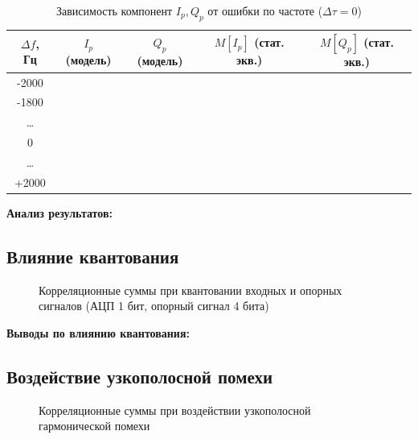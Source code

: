 \begin{table}[H]
    \centering
    \caption{Зависимость компонент $I_p, Q_p$ от ошибки по частоте ($\Delta \tau = 0$)}
    \begin{tabular}{@{}ccccc@{}}
        \toprule
        $\Delta f$, Гц & $I_p$ (модель) & $Q_p$ (модель) & $M[I_p]$ (стат. экв.) & $M[Q_p]$ (стат. экв.) \\ \midrule
        -2000 & & & & \\
        -1800 & & & & \\
        \dots & & & & \\
        0 & & & & \\
        \dots & & & & \\
        +2000 & & & & \\ \bottomrule
    \end{tabular}
\end{table}

\textbf{Анализ результатов:}\\

\subsection{Влияние квантования}

\begin{figure}[H]
    \centering
    \caption{Корреляционные суммы при квантовании входных и опорных сигналов (АЦП 1 бит, опорный сигнал 4 бита)}
\end{figure}
\textbf{Выводы по влиянию квантования:}\\

\subsection{Воздействие узкополосной помехи}

\begin{figure}[H]
    \centering
    \caption{Корреляционные суммы при воздействии узкополосной гармонической помехи}
\end{figure}

